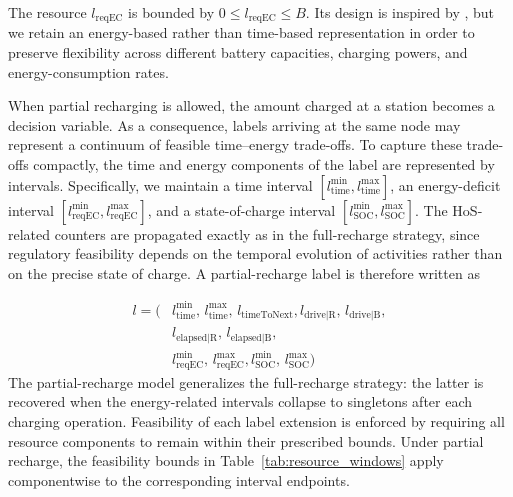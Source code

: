 \documentclass[3p,11pt,authoryear]{elsarticle}  %
\begin{document}
The resource \(l_{\text{reqEC}}\) is bounded by \(0 \leq l_{\text{reqEC}} \leq B\). Its design is inspired by \citet{desaulniers2016exact}, but we retain an energy-based rather than time-based representation in order to preserve flexibility across different battery capacities, charging powers, and energy-consumption rates.

When partial recharging is allowed, the amount charged at a station becomes a decision variable. As a consequence, labels arriving at the same node may represent a continuum of feasible time--energy trade-offs. To capture these trade-offs compactly, the time and energy components of the label are represented by intervals. Specifically, we maintain a time interval \([l_{\text{time}}^{\min},l_{\text{time}}^{\max}]\), an energy-deficit interval \([l_{\text{reqEC}}^{\min},l_{\text{reqEC}}^{\max}]\), and a state-of-charge interval \([l_{\text{SOC}}^{\min},l_{\text{SOC}}^{\max}]\). The HoS-related counters are propagated exactly as in the full-recharge strategy, since regulatory feasibility depends on the temporal evolution of activities rather than on the precise state of charge. A partial-recharge label is therefore written as


\[
\begin{aligned}
l = (&l_{\text{time}}^{\min},\, l_{\text{time}}^{\max},\, l_{\text{timeToNext}}, l_{\text{drive|R}},\, l_{\text{drive|B}},\\
     &l_{\text{elapsed|R}},\, l_{\text{elapsed|B}}, \\ 
     &l_{\text{reqEC}}^{\min},\, l_{\text{reqEC}}^{\max},
     l_{\text{SOC}}^{\min},\, l_{\text{SOC}}^{\max})
\end{aligned}
\]
The partial-recharge model generalizes the full-recharge strategy: the latter is recovered when the energy-related intervals collapse to singletons after each charging operation. Feasibility of each label extension is enforced by requiring all resource components to remain within their prescribed bounds. Under partial recharge, the feasibility bounds in Table~\ref{tab:resource_windows} apply componentwise to the corresponding interval endpoints.
\end{document}

